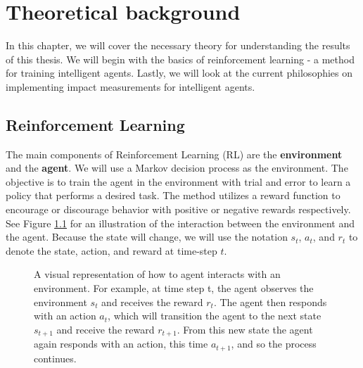 \documentclass[12pt,A4]{report}
\theoremstyle{definition}
\begin{document}
 


\chapter{Theoretical background}
In this chapter, we will cover the necessary theory for understanding the results of this thesis. We will begin with the basics of reinforcement learning - a method for training intelligent agents. Lastly, we will look at the current philosophies on implementing impact measurements for intelligent agents. 

\section{Reinforcement Learning}
The main components of Reinforcement Learning (RL) are the \textbf{environment} and the \textbf{agent}. We will use a Markov decision process as the environment. The objective is to train the agent in the environment with trial and error to learn a policy that performs a desired task. The method utilizes a reward function to encourage or discourage behavior with positive or negative rewards respectively. See Figure \ref{fig:RL} for an illustration of the interaction between the environment and the agent. Because the state will change, we will use the notation $s_t$, $a_t$, and $r_t$ to denote the state, action, and reward at time-step $t$.


\begin{figure}[H]
  
  \caption{A visual representation of how to agent interacts with an environment. For example, at time step t, the agent observes the environment $s_t$ and receives the reward $r_t$. The agent then responds with an action $a_t$, which will transition the agent to the next state $s_{t+1}$ and receive the reward $r_{t+1}$. From this new state the agent again responds with an action, this time $a_{t+1}$, and so the process continues. } 
  \label{fig:RL}
\end{figure} 
 
\end{document}
